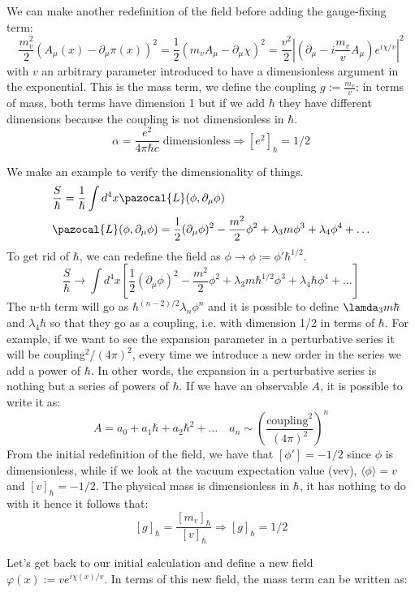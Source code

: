 \documentclass[../main.tex]{subfiles}
\begin{document}
We can make another redefinition of the field before adding the gauge-fixing term:
\[
\frac{m_v^2}{2}(A_\mu(x)-\partial_\mu\pi(x))^2=\frac{1}{2}(m_vA_\mu-\partial_\mu\chi)^2=\frac{v^2}{2}\left|\left(\partial_\mu-i\frac{m_v}{v}A_\mu\right)e^{i\chi/v}\right|^2
\]
with $v$ an arbitrary parameter introduced to have a dimensionless argument in the exponential. This is the mass term, we define the coupling $g:=\frac{m_v}{v}$: in terms of mass, both terms have dimension 1 but if we add $\hbar$ they have different dimensions because the coupling is not dimensionless in $\hbar$.
\[
\alpha=\frac{e^2}{4\pi\hbar c} \;\text{dimensionless}\Rightarrow[e^2]_\hbar=1/2
\]
\begin{example} We make an example to verify the dimensionality of things.
\begin{align*}
&\frac{S}{\hbar}=\frac{1}{\hbar}\int d^4x\pazocal{L}(\phi,\partial_\mu\phi)\\
&\pazocal{L}(\phi,\partial_\mu\phi)=\frac{1}{2}(\partial_\mu\phi)^2-\frac{m^2}{2}\phi^2+\lambda_3m\phi^3+\lambda_4\phi^4+\dots
\end{align*}
To get rid of $\hbar$, we can redefine the field as $\phi\to\phi:=\phi'\hbar^{1/2}$.
\[
\frac{S}{\hbar}\to\int d^4x\left[\frac{1}{2}(\partial_\mu\phi)^2-\frac{m^2}{2}\phi^2+\lambda_3m\hbar^{1/2}\phi^3+\lambda_4\hbar\phi^4+\dots\right]
\]
The n-th term will go as $\hbar^{(n-2)/2}\lambda_n\phi^n$ and it is possible to define $\lamda_3m\hbar$ and $\lambda_4\hbar$ so that they go as a coupling, i.e. with dimension 1/2 in terms of $\hbar$. For example, if we want to see the expansion parameter in a perturbative series it will be coupling$^2$/$(4\pi)^2$, every time we introduce a new order in the series we add a power of $\hbar$. In other words, the expansion in a perturbative series is nothing but a series of powers of $\hbar$. If we have an observable $A$, it is possible to write it as:
\[
A=a_0+a_1\hbar+a_2\hbar^2+\dots \quad a_n\sim\left(\frac{\text{coupling}^2}{(4\pi)^2}\right)^n
\]
From the initial redefinition of the field, we have that $[\phi']=-1/2$ since $\phi$ is dimensionless, while if we look at the vacuum expectation value (vev), $\langle\phi\rangle=v$ and $[v]_\hbar=-1/2$. The physical mass is dimensionless in $\hbar$, it has nothing to do with it hence it follows that:
\[
[g]_\hbar=\frac{[m_v]_\hbar}{[v]_\hbar}\Rightarrow[g]_\hbar=1/2
\]
\end{example}
Let's get back to our initial calculation and define a new field\\
$\varphi(x):=ve^{i\chi(x)/v}$. In terms of this new field, the mass term can be written as:
\end{document}
